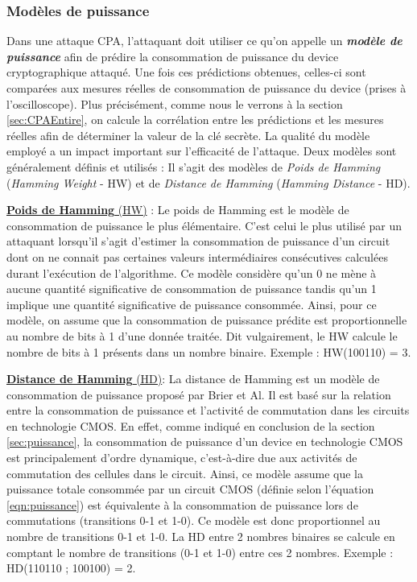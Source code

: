 \documentclass[10pt, oneside, a4paper]{article}
\begin{document}
\subsubsection{Modèles de puissance}
\label{sec:modelpuissance}
\vspace{-0.1 cm}Dans une attaque CPA, l'attaquant doit utiliser ce qu'on appelle un \textbf{\textit{modèle de puissance}} afin de prédire la consommation de puissance du device cryptographique attaqué. Une fois ces prédictions obtenues, celles-ci sont comparées aux mesures réelles de consommation de puissance du device (prises à l'oscilloscope). Plus précisément, comme nous le verrons à la section \ref{sec:CPAEntire}, on calcule la corrélation entre les prédictions et les mesures réelles afin de déterminer la valeur de la clé secrète. La qualité du modèle employé a un impact important sur l'efficacité de l'attaque. Deux modèles sont généralement définis et utilisés : Il s'agit des modèles de \textit{Poids de Hamming} (\textit{Hamming Weight} - HW) et de \textit{Distance de Hamming} (\textit{Hamming Distance} - HD).

\underline{\textbf{Poids de Hamming} (HW)} : Le poids de Hamming est le modèle de consommation de puissance le plus élémentaire. C'est celui le plus utilisé par un attaquant lorsqu'il s'agit d'estimer la consommation de puissance d'un circuit dont on ne connait pas certaines valeurs intermédiaires consécutives calculées durant l'exécution de l'algorithme. Ce modèle considère qu'un 0 ne mène à aucune quantité significative de consommation de puissance tandis qu'un 1 implique une quantité significative de puissance consommée. Ainsi, pour ce modèle, on assume que la consommation de puissance prédite est proportionnelle au nombre de bits à 1 d'une donnée traitée. Dit vulgairement, le HW calcule le nombre de bits à 1 présents dans un nombre binaire. Exemple : HW(100110) = 3.

\underline{\textbf{Distance de Hamming} (HD)}: La distance de Hamming est un modèle de consommation de puissance proposé par Brier et Al. Il est basé sur la relation entre la consommation de puissance et l'activité de commutation dans les circuits en technologie CMOS. En effet, comme indiqué en conclusion de la section \ref{sec:puissance}, la consommation de puissance d'un device en technologie CMOS est principalement d'ordre dynamique, c'est-à-dire due aux activités de commutation des cellules dans le circuit. Ainsi, ce modèle assume que la puissance totale consommée par un circuit CMOS (définie selon l'équation \ref{eqn:puissance}) est équivalente à la consommation de puissance lors de commutations (transitions 0-1 et 1-0). Ce modèle est donc proportionnel au nombre de transitions 0-1 et 1-0. La HD entre 2 nombres binaires se calcule en comptant le nombre de transitions (0-1 et 1-0) entre ces 2 nombres. Exemple : HD(110110 ; 100100) = 2.
\end{document}
